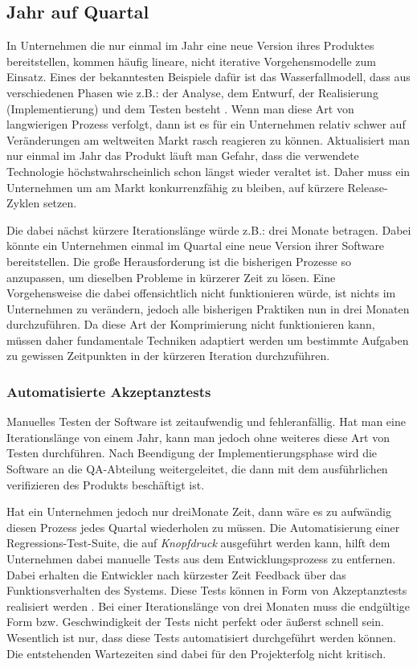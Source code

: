 \subsection{Jahr auf Quartal}
\label{subsec:jahr-auf-quartal}

In Unternehmen die nur einmal im Jahr eine neue Version ihres Produktes
bereitstellen, kommen häufig lineare, nicht iterative Vorgehensmodelle zum
Einsatz. Eines der bekanntesten Beispiele dafür ist das Wasserfallmodell, dass
aus verschiedenen Phasen wie z.B.: der Analyse, dem Entwurf, der Realisierung
(Implementierung) und dem Testen besteht \cite{Royce:1987:MDL:41765.41801}. Wenn man diese Art von langwierigen Prozess verfolgt, dann ist es für ein Unternehmen relativ schwer auf
Veränderungen am weltweiten Markt rasch reagieren zu können. Aktualisiert man
nur einmal im Jahr das Produkt läuft man Gefahr, dass die verwendete
Technologie höchstwahrscheinlich schon längst wieder veraltet ist. Daher muss
ein Unternehmen um am Markt konkurrenzfähig zu bleiben, auf kürzere Release-
Zyklen setzen.

Die dabei nächst kürzere Iterationslänge würde z.B.: drei Monate betragen.
Dabei könnte ein Unternehmen einmal im Quartal eine neue Version ihrer
Software bereitstellen. Die große Herausforderung ist die bisherigen Prozesse
so anzupassen, um dieselben Probleme in kürzerer Zeit zu lösen. Eine
Vorgehensweise die dabei offensichtlich nicht funktionieren würde, ist nichts
im Unternehmen zu verändern, jedoch alle bisherigen Praktiken nun in drei
Monaten durchzuführen. Da diese Art der Komprimierung nicht funktionieren
kann, müssen daher fundamentale Techniken adaptiert werden um bestimmte
Aufgaben zu gewissen Zeitpunkten in der kürzeren Iteration durchzuführen.

\subsubsection{Automatisierte Akzeptanztests}
\label{minisec:automatisierte-akzeptanztests}
Manuelles Testen der Software ist zeitaufwendig und fehleranfällig. Hat man
eine Iterationslänge von einem Jahr, kann man jedoch ohne weiteres diese Art
von Testen durchführen. Nach Beendigung der Implementierungsphase wird die
Software an die QA-Abteilung weitergeleitet, die dann mit dem ausführlichen
verifizieren des Produkts beschäftigt ist. 

Hat ein Unternehmen jedoch nur dreiMonate Zeit, dann wäre es zu aufwändig diesen Prozess jedes Quartal wiederholen zu müssen. Die Automatisierung einer Regressions-Test-Suite, die
auf \emph{Knopfdruck} ausgeführt werden kann, hilft dem Unternehmen dabei
manuelle Tests aus dem Entwicklungsprozess zu entfernen. Dabei erhalten die
Entwickler nach kürzester Zeit Feedback über das Funktionsverhalten des
Systems. Diese Tests können in Form von Akzeptanztests realisiert werden \cite{pugh2010}. Bei
einer Iterationslänge von drei Monaten muss die endgültige Form bzw.
Geschwindigkeit der Tests nicht perfekt oder äußerst schnell sein. Wesentlich
ist nur, dass diese Tests automatisiert durchgeführt werden können. Die
entstehenden Wartezeiten sind dabei für den Projekterfolg nicht kritisch.

